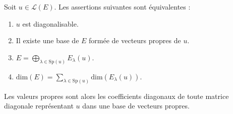 \documentclass[french,11pt,twoside]{VcCours}
\begin{document}
\begin{Theoreme}{} Soit $u \in \mathcal{L}(E)$. Les assertions suivantes sont équivalentes : 

\begin{enumerate}
\item $u$ est diagonalisable.
\item Il existe une base de $E$ formée de vecteurs propres de $u$.
\item $E = \bigoplus_{\lambda \in \textrm{Sp}(u)} E_{\lambda}(u)$.
\item $\textrm{dim}(E) = \sum_{\lambda \in \textrm{Sp}(u)} \textrm{dim}(E_{\lambda}(u))$.
\end{enumerate}
Les valeurs propres sont alors les coefficients diagonaux de toute matrice diagonale représentant $u$ dans une base de vecteurs propres.
\end{Theoreme}
%
\end{document}
